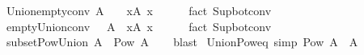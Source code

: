 \begin{isabellebody}
\endisatagproof
{\isafoldproof}%
%
\isadelimproof
\isanewline
%
\endisadelimproof
\isanewline
{}\isamarkupfalse%
\ Union{\isacharunderscore}{\kern0pt}empty{\isacharunderscore}{\kern0pt}conv{\isacharcolon}{\kern0pt}\ {\isachardoublequoteopen}{\isacharparenleft}{\kern0pt}{\isasymUnion}A\ {\isacharequal}{\kern0pt}\ {\isacharbraceleft}{\kern0pt}{\isacharbraceright}{\kern0pt}{\isacharparenright}{\kern0pt}\ {\isasymlongleftrightarrow}\ {\isacharparenleft}{\kern0pt}{\isasymforall}x{\isasymin}A{\isachardot}{\kern0pt}\ x\ {\isacharequal}{\kern0pt}\ {\isacharbraceleft}{\kern0pt}{\isacharbraceright}{\kern0pt}{\isacharparenright}{\kern0pt}{\isachardoublequoteclose}\isanewline
%
\isadelimproof
\ \ %
\endisadelimproof
%
\isatagproof
{}\isamarkupfalse%
\ {\isacharparenleft}{\kern0pt}fact\ Sup{\isacharunderscore}{\kern0pt}bot{\isacharunderscore}{\kern0pt}conv{\isacharparenright}{\kern0pt}%
\endisatagproof
{\isafoldproof}%
%
\isadelimproof
%
\endisadelimproof
\ \isanewline
\isanewline
{}\isamarkupfalse%
\ empty{\isacharunderscore}{\kern0pt}Union{\isacharunderscore}{\kern0pt}conv{\isacharcolon}{\kern0pt}\ {\isachardoublequoteopen}{\isacharparenleft}{\kern0pt}{\isacharbraceleft}{\kern0pt}{\isacharbraceright}{\kern0pt}\ {\isacharequal}{\kern0pt}\ {\isasymUnion}A{\isacharparenright}{\kern0pt}\ {\isasymlongleftrightarrow}\ {\isacharparenleft}{\kern0pt}{\isasymforall}x{\isasymin}A{\isachardot}{\kern0pt}\ x\ {\isacharequal}{\kern0pt}\ {\isacharbraceleft}{\kern0pt}{\isacharbraceright}{\kern0pt}{\isacharparenright}{\kern0pt}{\isachardoublequoteclose}\isanewline
%
\isadelimproof
\ \ %
\endisadelimproof
%
\isatagproof
{}\isamarkupfalse%
\ {\isacharparenleft}{\kern0pt}fact\ Sup{\isacharunderscore}{\kern0pt}bot{\isacharunderscore}{\kern0pt}conv{\isacharparenright}{\kern0pt}%
\endisatagproof
{\isafoldproof}%
%
\isadelimproof
%
\endisadelimproof
\ \isanewline
\isanewline
{}\isamarkupfalse%
\ subset{\isacharunderscore}{\kern0pt}Pow{\isacharunderscore}{\kern0pt}Union{\isacharcolon}{\kern0pt}\ {\isachardoublequoteopen}A\ {\isasymsubseteq}\ Pow\ {\isacharparenleft}{\kern0pt}{\isasymUnion}A{\isacharparenright}{\kern0pt}{\isachardoublequoteclose}\isanewline
%
\isadelimproof
\ \ %
\endisadelimproof
%
\isatagproof
{}\isamarkupfalse%
\ blast%
\endisatagproof
{\isafoldproof}%
%
\isadelimproof
\isanewline
%
\endisadelimproof
\isanewline
{}\isamarkupfalse%
\ Union{\isacharunderscore}{\kern0pt}Pow{\isacharunderscore}{\kern0pt}eq\ {\isacharbrackleft}{\kern0pt}simp{\isacharbrackright}{\kern0pt}{\isacharcolon}{\kern0pt}\ {\isachardoublequoteopen}{\isasymUnion}{\isacharparenleft}{\kern0pt}Pow\ A{\isacharparenright}{\kern0pt}\ {\isacharequal}{\kern0pt}\ A{\isachardoublequoteclose}\isanewline

\end{isabellebody}
